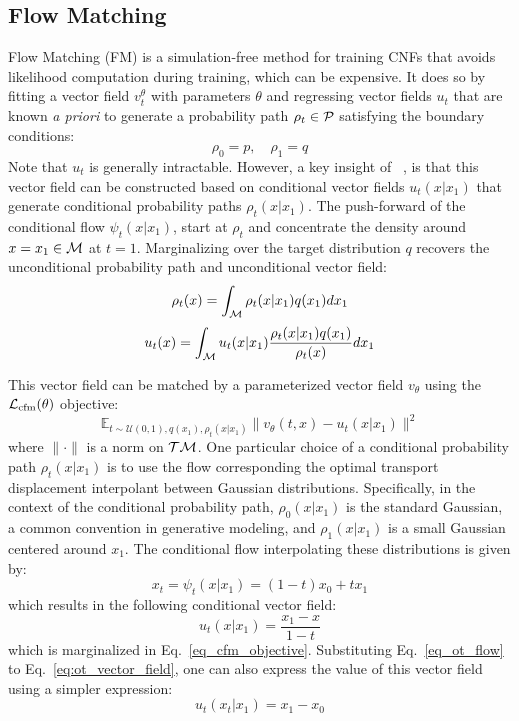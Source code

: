 \subsection{Flow Matching}
\label{sec:flow_matching}
Flow Matching (FM) \citep{lipman2022flow} is a simulation-free method for training CNFs that avoids likelihood computation during training, which can be expensive.  It does so by fitting a vector field $v_{t}^\theta$ with parameters $\theta$
and regressing vector fields $u_t$ that are known \emph{a priori} to generate a probability path $\rho_t \in {\mathcal{P}}$ satisfying the boundary conditions:
\begin{equation}\label{eq:boundary_conditions}
    \rho_0=p, \quad \rho_1=q
\end{equation} 
Note that $u_t$ is generally intractable. However, a key insight of ~\cite{lipman2022flow}, is that this vector field can be constructed based on conditional vector fields $u_t(x|x_1)$ that generate conditional probability paths $\rho_t(x|x_1)$. The push-forward of the conditional flow $\psi_t(x|x_1)$, start at $\rho_t$ and concentrate the density around $x=x_1 \in {\mathcal{M}}$ at $t=1$. Marginalizing over the target distribution $q$ recovers the unconditional probability path and unconditional vector field:
\begin{equation}
    \rho_t(x) = \int_{{\mathcal{M}}} \rho_t(x|x_1)q(x_1)dx_1
\end{equation} 
\begin{equation}
    u_t(x) = \int_{{\mathcal{M}}} u_t(x|x_1)\frac{\rho_t(x|x_1)q(x_1)}{\rho_t(x)}dx_1
\end{equation}

This vector field can be matched by a parameterized vector field $v_\theta$ using the ${\mathcal{L}}_{\rm cfm}(\theta)$ objective:
\begin{equation}\label{eq_cfm_objective}
    \mathbb{E}_{t\sim \mathcal{U}(0,1), q(x_1), \rho_t(x | x_1)} \|v_\theta(t, x) - u_t(x | x_1)\|^2
\end{equation}
where $\|\cdot\|$ is a norm on ${\mathcal{T}}{\mathcal{M}}$.
One particular choice of a conditional probability path $\rho_t(x|x_1)$ is to use the flow corresponding the optimal transport displacement interpolant \citep{McCann1997ACP} between Gaussian distributions. Specifically, in the context of the conditional probability path, $\rho_0(x|x_1)$ is the standard Gaussian, a common convention in generative modeling, and $\rho_1(x|x_1)$ is a small Gaussian centered around $x_1$.
The conditional flow interpolating these distributions is given by:
\begin{equation}\label{eq_ot_flow}
    x_t = \psi_t(x|x_1) = (1-t)x_0 + tx_1
\end{equation}
which results in the following conditional vector field:
\begin{equation}\label{eq:ot_vector_field}
    u_t(x|x_1) = \frac{x_1-x}{1-t}
\end{equation}
which is marginalized in Eq.~\ref{eq_cfm_objective}.
Substituting Eq.~\ref{eq_ot_flow} to Eq.~\ref{eq:ot_vector_field}, one can also express the value of this vector field using a simpler expression:
\begin{equation}\label{eq_ot_final_vector_field}
    u_t(x_t|x_1) = x_1 - x_0
\end{equation}

